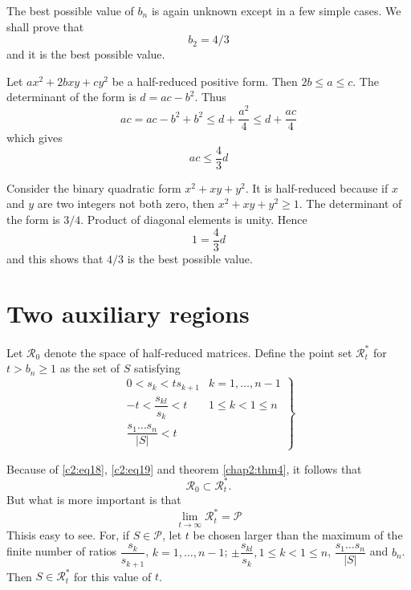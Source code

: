 The best possible value of $b_{n}$ is again unknown except in a few
simple cases. We shall prove that
\begin{equation*}
b_{2}=4/3\tag{30}\label{c2:eq30}
\end{equation*}
and it is the best possible value.

Let $ax^{2}+2bxy+cy^{2}$ be a half-reduced positive form. Then $2b\leq
a\leq c$. The determinant of the form is
$d=ac-b^{2}$. Thus\pageoriginale
$$
ac=ac-b^{2}+b^{2}\leq d+\frac{a^{2}}{4}\leq d+\frac{ac}{4}
$$
which gives
\begin{equation*}
ac\leq \frac{4}{3}d\tag{31}\label{c2:eq31}
\end{equation*}

Consider the binary quadratic form $x^{2}+xy+y^{2}$. It is
half-reduced because if $x$ and $y$ are two integers not both zero,
then $x^{2}+xy+y^{2}\geq 1$. The determinant of the form is
$3/4$. Product of diagonal elements is unity. Hence
$$
1=\frac{4}{3}d
$$
and this shows that $4/3$ is the best possible value.

\section{Two auxiliary regions}\label{chap2:sec4}

Let $\mathscr{R}_{0}$ denote the space of half-reduced
matrices. Define the point set $\mathscr{R}_{t}^{\ast}$ for
$t>b_{n}\geq 1$ as the set of $S$ satisfying
\begin{equation*}
\left.
\begin{array}{cc}
0<s_{k}<ts_{k+1} & k=1,\ldots,n-1\\[10pt]
-t<\dfrac{s_{kl}}{s_{k}}<t & 1\leq k<1\leq n\\[10pt]
\dfrac{s_{1}\ldots s_{n}}{|S|}<t &
\end{array}
\right\}\tag{32}\label{c2:eq32}
\end{equation*}

Because of \eqref{c2:eq18}, \eqref{c2:eq19} and theorem \ref{chap2:thm4}, it follows
that
\begin{equation*}
\mathscr{R}_{0}\subset \mathscr{R}^{\ast}_{t}.\tag{33}\label{c2:eq33}
\end{equation*}
But what is more important is that
\begin{equation*}
\lim\limits_{t\to
  \infty}\mathscr{R}^{\ast}_{t}=\mathscr{P}\tag{34}\label{c2:eq34} 
\end{equation*}
This\pageoriginale is easy to see. For, if $S\in\mathscr{P}$, let $t$
be chosen larger than the maximum of the finite number of ratios
$\dfrac{s_{k}}{s_{k+1}}$, $k=1,\ldots,n-1$; $\pm
\dfrac{s_{kl}}{s_{k}},1\leq k<1\leq n$, $\dfrac{s_{1}\ldots
  s_{n}}{|S|}$ and $b_{n}$. Then $S\in \mathscr{R}^{\ast}_{t}$ for
this value of $t$.

